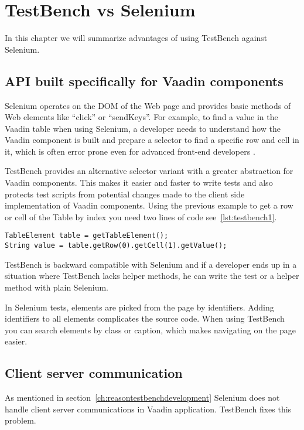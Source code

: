 \chapter{TestBench vs Selenium}
\label{ch:testbenchvsselenium}
In this chapter we will summarize advantages of using TestBench against
Selenium.

\section{API built specifically for Vaadin components}
Selenium operates on the DOM of the Web page and provides basic methods of
Web elements like ``click'' or ``sendKeys''. For example, to find a value in the Vaadin table
 when using Selenium, a developer needs to understand how the Vaadin component
 is built and prepare a selector to find a specific row and cell in it, which is often error prone even
 for advanced front-end developers \cite{vaadinBlogCompare}.
 
TestBench provides an alternative selector variant with a greater abstraction for Vaadin components.
This makes it easier and faster to write tests and also protects test scripts
from potential changes made to the client side implementation of Vaadin components.
 Using the previous example to get a row or cell of the Table by index you need two lines of code
 see~\ref{lst:testbench1}.
    \lstset{style=a1listing}
    \begin{lstlisting}[caption=Get Vaadin Table cell Value,label={lst:testbench1}]
TableElement table = getTableElement();
String value = table.getRow(0).getCell(1).getValue();
  \end{lstlisting}

TestBench is backward compatible with Selenium and if a developer ends up in a
situation where TestBench lacks helper methods, he can write the test or a
helper method with plain Selenium.

In Selenium tests, elements are picked from the page by identifiers.
Adding identifiers to all elements complicates the source code. When using TestBench you can
search elements by class or caption, which makes navigating on the page easier.
	
\section{Client server communication}
As mentioned in section~\ref{ch:reasontestbenchdevelopment}
Selenium does not handle client server communications in Vaadin
application. TestBench fixes this problem.

